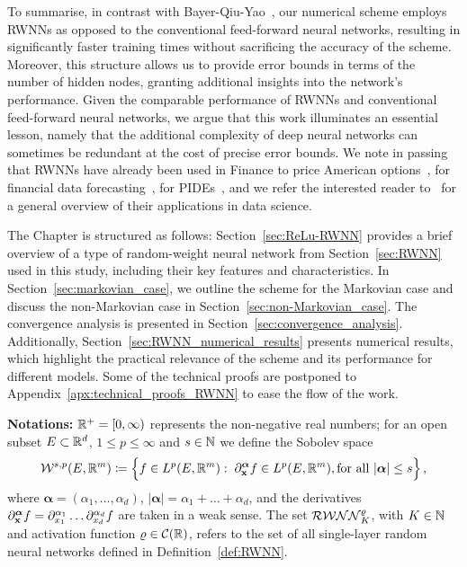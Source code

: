 To summarise, in contrast with Bayer-Qiu-Yao~\cite{Bayer2022PricingSPDEs}, our numerical scheme employs RWNNs as opposed to the conventional feed-forward neural networks, resulting in significantly faster training times without sacrificing the accuracy of the scheme. 
Moreover, this structure allows us to provide error bounds in terms of the number of hidden nodes, granting additional insights into the network's performance. Given the comparable performance of RWNNs and conventional feed-forward neural networks, we argue that this work illuminates an essential lesson, namely that the additional complexity of deep neural networks can sometimes be redundant at the cost of precise error bounds.
We note in passing that RWNNs have already been used in Finance to price American options~\cite{Herrera2021OptimalNetworks}, 
for financial data forecasting~\cite{Liu2018FinancialNetwork}, for PIDEs~\cite{Gonon2023DeepEquations},
and we refer the interested reader to~\cite{Cao2018AWeights} for a general overview of their applications in data science.

The Chapter is structured as follows: Section~\ref{sec:ReLu-RWNN} provides a brief overview of a type of random-weight neural network from Section~\ref{sec:RWNN} used in this study, including their key features and characteristics. 
In Section~\ref{sec:markovian_case}, we outline the scheme for the Markovian case and discuss the non-Markovian case in Section~\ref{sec:non-Markovian_case}.
The convergence analysis is presented in Section~\ref{sec:convergence_analysis}. Additionally, Section~\ref{sec:RWNN_numerical_results} presents numerical results, which highlight the practical relevance of the scheme and its performance for different models.
Some of the technical proofs are postponed to Appendix~\ref{apx:technical_proofs_RWNN} to ease the flow of the work.


\textbf{Notations:}
$\mathbb{R}^+ = [0,\infty)$ represents the non-negative real numbers;
for an open subset $E\subset \mathbb{R}^d$, 
$1\leq p \leq \infty$ and $s \in \mathbb{N}$ 
we define the Sobolev space
$$
\mathcal{W}^{s, p}(E, \mathbb{R}^m)
\coloneqq  \Big\{f \in L^p(E, \mathbb{R}^m): \; \partial_{\mathbf{x}}^{\boldsymbol{\alpha}} f \in L^p(E, \mathbb{R}^m), \text{for all } |\boldsymbol{\alpha}| \leq s\Big\}\,,
$$
where $\boldsymbol{\alpha} = \left(\alpha_1, \ldots, \alpha_d\right)$, $|\boldsymbol{\alpha}|=\alpha_1+\ldots+\alpha_d$, and the derivatives $\partial_{\mathbf{x}}^{\boldsymbol{\alpha}} f = \partial_{x_1}^{\alpha_1} \dots \partial_{x_d}^{\alpha_d} f$ are taken in a weak sense. The set $\mathcal{RWNN}^\varrho_K$, with $K\in\mathbb{N}$ and activation function $\varrho\in\mathcal{C}(\mathbb{R})$, refers to the set of all single-layer random neural networks defined in Definition~\ref{def:RWNN}.

